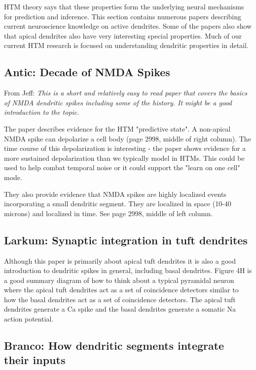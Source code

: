 \documentclass{article} %
\begin{document}
HTM theory says that these properties form the underlying neural mechanisms for
prediction and inference. This section contains numerous papers describing
current neuroscience knowledge on active dendrites.  Some of the papers also
show that apical dendrites also have very interesting special properties.  Much
of our current HTM research is focused on understanding dendritic properties in
detail.

\subsection{Antic: Decade of NMDA Spikes}
From Jeff: \emph{This is a short and relatively easy to read paper that covers
 the basics of NMDA dendritic spikes including some of the history.  It might be a
good introduction to the topic.}

The paper \cite{Antic2010} describes evidence for the HTM "predictive state". A
non-apical NMDA spike can depolarize a cell body (page 2998, middle of right
column). The time course of this depolarization is interesting - the paper shows
evidence for a more sustained depolarization than we typically model in HTMs.
This could be used to help combat temporal noise or it could support the "learn
on one cell" mode.

They also provide evidence that NMDA spikes are highly localized events
incorporating a small dendritic segment. They are localized in space (10-40
microns) and localized in time. See page 2998, middle of left column.

\subsection{Larkum: Synaptic integration in tuft dendrites}

Although this paper \cite{Larkum2009} is primarily about apical tuft dendrites
it is also a good introduction to dendritic spikes in general, including basal
dendrites.  Figure 4H is a good summary diagram of how to think about a typical
pyramidal neuron where the apical tuft dendrites act as a set of coincidence
detectors similar to how the basal dendrites act as a set of coincidence
detectors.  The apical tuft dendrites generate a Ca spike and the basal
dendrites generate a somatic Na action potential.

\subsection{Branco: How dendritic segments integrate their inputs}
\end{document}
